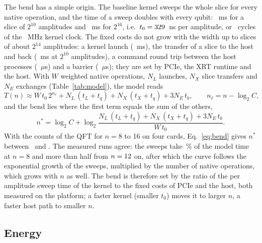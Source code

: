 The bend has a simple origin. The baseline kernel sweeps the whole slice for every native operation, and the time of a
sweep doubles with every qubit: \NumVsixSweepMsTen~ms for a slice of $2^{10}$ amplitudes and \NumVsixSweepMsSixteen~ms for
$2^{16}$, i.e.\ $t_0 = 329$~ns per amplitude, or \NumVsixCyclesPerAmp~cycles of the
\NumClockVsix~MHz kernel clock. The fixed costs do not grow with the width up to slices of about $2^{14}$ amplitudes: a
kernel launch (\NumVsixLaunchMsTen~ms), the transfer of a slice to the host and back (\NumVsixXferMsTen~ms at
$2^{10}$ amplitudes), a command round trip between the host processes (\NumQueueRttUs~$\mu$s) and a barrier
(\NumBarrierUs~$\mu$s); they are set by PCIe, the XRT runtime and the host. With $W$ weighted native operations,
$N_L$ launches, $N_X$ slice transfers and $N_E$ exchanges (Table~\ref{tab:model}), the model reads
\begin{equation}
T(n) \approx W\,t_0\,2^{n_\ell} + N_L\,(t_L + t_q) + N_X\,(t_X + t_q) + 3N_E\,t_b, \qquad n_\ell = n - \log_2 C,
\label{eq:model}
\end{equation}
and the bend lies where the first term equals the sum of the others,
\begin{equation}
n^\ast = \log_2 C + \log_2 \frac{N_L\,(t_L + t_q) + N_X\,(t_X + t_q) + 3N_E\,t_b}{W\,t_0}.
\label{eq:bend}
\end{equation}
With the counts of the QFT for $n=8$ to 16 on four cards, Eq.~\eqref{eq:bend} gives $n^\ast$ between
\NumModelNstarMin~and \NumModelNstarMax. The measured runs agree: the sweeps take \NumModelSweepShareEight\,\% of the model
time at $n=8$ and more than half from $n=12$ on, after which the curve follows the exponential growth of the
sweeps, multiplied by the number of native operations, which grows with $n$ as well. The bend is therefore set by the
ratio of the per amplitude sweep time of the kernel to the fixed costs of PCIe and the host, both measured on the
platform; a faster kernel (smaller $t_0$) moves it to larger $n$, a faster host path to smaller $n$.

\subsection{Energy}\label{subsec:res-energy}

\begin{table}[t]
\caption{Board energy per simulation: time weighted mean of the board power of every used card (XMC sensors, about
one reading per second) times the end to end time. The last column is the smallest number of sensor readings
inside one run.}\label{tab:energy}

\end{table}

